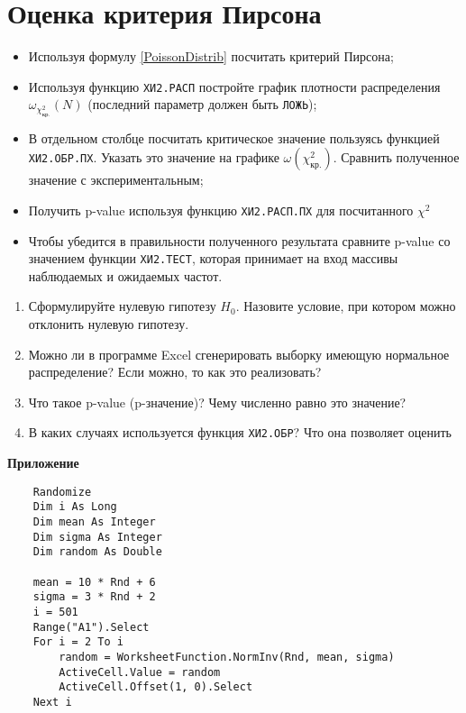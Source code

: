 \documentclass[14pt,a4paper]{article}
\begin{document}
\section{Оценка критерия Пирсона}
\begin{itemize}
	\item Используя формулу \ref{PoissonDistrib} посчитать критерий Пирсона;
	\item Используя функцию \texttt{ХИ2.РАСП} постройте график плотности распределения $\omega_{\chi_\text{кр.}^2}(N)$ (последний параметр должен быть \verb=ЛОЖЬ=);
	\item В отдельном столбце посчитать критическое значение пользуясь функцией \texttt{ХИ2.ОБР.ПХ}. Указать это значение на графике $\omega(\chi_\text{кр.}^2)$. Сравнить полученное значение с экспериментальным;
	\item Получить p-value используя функцию \texttt{ХИ2.РАСП.ПХ} для посчитанного $\chi^2$
	\item Чтобы убедится в правильности полученного результата сравните p-value со значением функции \texttt{ХИ2.ТЕСТ}, которая принимает на вход массивы наблюдаемых и ожидаемых частот.    
\end{itemize}

\questions{}
\begin{enumerate}
	\item Сформулируйте нулевую гипотезу $H_0$. Назовите условие, при котором можно отклонить нулевую гипотезу.
	\item Можно ли в программе Excel сгенерировать выборку имеющую нормальное распределение? Если можно, то как это реализовать? %
	\item Что такое p-value (p-значение)? Чему численно равно это значение?
	\item В каких случаях используется функция \texttt{ХИ2.ОБР}? Что она позволяет оценить
\end{enumerate}
\begin{center}
	\textbf{\Large Приложение}
\end{center}
	\renewcommand{\lstlistingname}{Листинг}
\begin{lstlisting}
	Randomize
	Dim i As Long
	Dim mean As Integer
	Dim sigma As Integer
	Dim random As Double

	mean = 10 * Rnd + 6
	sigma = 3 * Rnd + 2
	i = 501
	Range("A1").Select
	For i = 2 To i
		random = WorksheetFunction.NormInv(Rnd, mean, sigma)
		ActiveCell.Value = random
		ActiveCell.Offset(1, 0).Select
	Next i
	\end{lstlisting}
\end{document}
